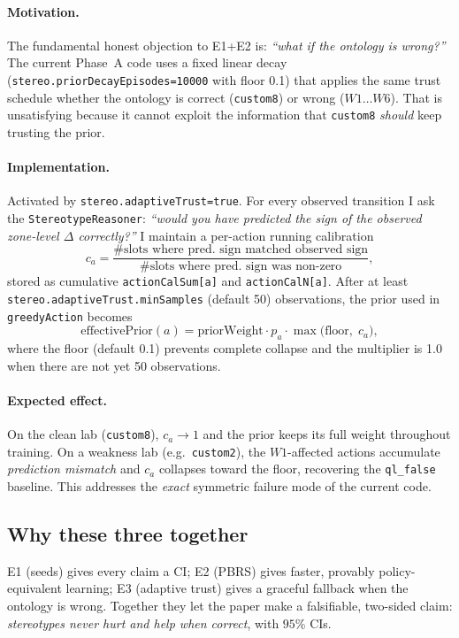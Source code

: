 \documentclass[conference]{IEEEtran}
\begin{document}
\paragraph{Motivation.} The fundamental honest objection to E1+E2 is:
\emph{``what if the ontology is wrong?''} The current Phase~A code
uses a fixed linear decay (\verb|stereo.priorDecayEpisodes=10000|
with floor 0.1) that applies the same trust schedule whether the
ontology is correct (\texttt{custom8}) or wrong ($W1\ldots W6$).
That is unsatisfying because it cannot exploit the information that
\texttt{custom8} \emph{should} keep trusting the prior.

\paragraph{Implementation.}
Activated by \verb|stereo.adaptiveTrust=true|. For every observed
transition I ask the \texttt{StereotypeReasoner}:
\emph{``would you have predicted the sign of the observed zone-level
$\Delta$ correctly?''} I maintain a per-action running calibration
$$
c_a = \frac{\#\text{slots where pred.\ sign matched observed sign}}
            {\#\text{slots where pred.\ sign was non-zero}},
$$
stored as cumulative \verb|actionCalSum[a]| and \verb|actionCalN[a]|.
After at least \verb|stereo.adaptiveTrust.minSamples| (default 50)
observations, the prior used in \verb|greedyAction| becomes
$$
\text{effectivePrior}(a) =
   \text{priorWeight}\cdot p_a \cdot
   \max\bigl(\text{floor},\;c_a\bigr),
$$
where the floor (default 0.1) prevents complete collapse and the
multiplier is 1.0 when there are not yet 50 observations.

\paragraph{Expected effect.}
On the clean lab (\texttt{custom8}), $c_a \to 1$ and the prior keeps
its full weight throughout training. On a weakness lab (e.g.\
\texttt{custom2}), the $W1$-affected actions accumulate
\emph{prediction mismatch} and $c_a$ collapses toward the floor,
recovering the \texttt{ql\_false} baseline. This addresses the
\emph{exact} symmetric failure mode of the current code.

\subsection{Why these three together}
E1 (seeds) gives every claim a CI; E2 (PBRS) gives faster, provably
policy-equivalent learning; E3 (adaptive trust) gives a graceful
fallback when the ontology is wrong. Together they let the paper make
a falsifiable, two-sided claim: \emph{stereotypes never hurt and help
when correct}, with $95$\% CIs.
\end{document}
